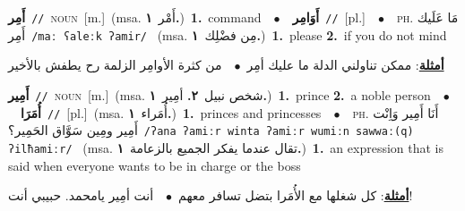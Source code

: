 \documentclass[10pt,a4paper,twoside]{article} %
\begin{document}
\begin{multicols}{2}
{\setlength\topsep{0pt}\textbf{\foreignlanguage{arabic}{أَمِر}}\ {\color{gray}\texttt{//}\color{black}}\ \textsc{noun}\ [m.]\ \color{gray}(msa. \foreignlanguage{arabic}{أَمْر}~\foreignlanguage{arabic}{\textbf{١.}})\color{black}\ \textbf{1.}~command\ \ $\bullet$\ \ \setlength\topsep{0pt}\textbf{\foreignlanguage{arabic}{أَوَامِر}}\ {\color{gray}\texttt{//}\color{black}}\ [pl.]\ \ $\bullet$\ \ \textsc{ph.} \color{gray} \foreignlanguage{arabic}{مَا عَلَيك أَمِر}\color{black}\ {\color{gray}\texttt{/{\sffamily maː ʕaleːk ʔamir}/}\color{black}}\ \color{gray} (msa. \foreignlanguage{arabic}{مِن فضْلِك}~\foreignlanguage{arabic}{\textbf{١.}})\color{black}\ \textbf{1.}~please  \textbf{2.}~if you do not mind\  \begin{flushright}\color{gray}\foreignlanguage{arabic}{\textbf{\underline{\foreignlanguage{arabic}{أمثلة}}}: ممكن تناولني الدلة ما عليك أمِر\ $\bullet$\ \  من كثرة الأوامِر الزلمة رح يطفش بالأخير}\end{flushright}\color{black}} \vspace{2mm}

{\setlength\topsep{0pt}\textbf{\foreignlanguage{arabic}{أَمِير}}\ {\color{gray}\texttt{//}\color{black}}\ \textsc{noun}\ [m.]\ \color{gray}(msa. \foreignlanguage{arabic}{شخص نبيل}~\foreignlanguage{arabic}{\textbf{٢.}}  \foreignlanguage{arabic}{أمِير}~\foreignlanguage{arabic}{\textbf{١.}})\color{black}\ \textbf{1.}~prince  \textbf{2.}~a noble person\ \ $\bullet$\ \ \setlength\topsep{0pt}\textbf{\foreignlanguage{arabic}{أُمَرَا}}\ {\color{gray}\texttt{//}\color{black}}\ [pl.]\ \color{gray}(msa. \foreignlanguage{arabic}{أُمَراء}~\foreignlanguage{arabic}{\textbf{١.}})\color{black}\ \textbf{1.}~princes and princesses\ \ $\bullet$\ \ \textsc{ph.} \color{gray} \foreignlanguage{arabic}{أَنَا أَمِير وَاِنْت أَمِير ومِين سَوَّاق الحَمِير؟}\color{black}\ {\color{gray}\texttt{/{\sffamily ʔana ʔamiːr winta ʔamiːr wumiːn sawwaː(q) ʔilħamiːr}/}\color{black}}\ \color{gray} (msa. \foreignlanguage{arabic}{تقال عندما يفكر الجميع بالزعامة}~\foreignlanguage{arabic}{\textbf{١.}})\color{black}\ \textbf{1.}~an expression that is said when everyone wants to be in charge or the boss\  \begin{flushright}\color{gray}\foreignlanguage{arabic}{\textbf{\underline{\foreignlanguage{arabic}{أمثلة}}}: كل شغلها مع الأُمَرا بتضل تسافر معهم\ $\bullet$\ \  أنت أمِير يامحمد. حبيبي أنت!}\end{flushright}\color{black}} \vspace{2mm}


\end{multicols}
\end{document}
